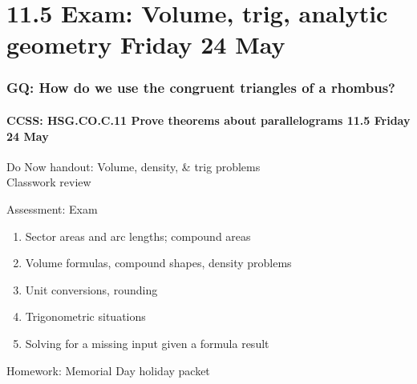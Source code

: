 \documentclass{beamer}
\begin{document}
\section{11.5 Exam: Volume, trig, analytic geometry Friday 24 May}
  \frame
  {
    \frametitle{GQ: How do we use the congruent triangles of a rhombus?}
    \framesubtitle{CCSS: HSG.CO.C.11 Prove theorems about parallelograms \hfill \alert{11.5 Friday 24 May}}

    Do Now handout: Volume, density, \& trig problems\\
    Classwork review
    \begin{block}{Assessment: Exam}
      \begin{enumerate}
        \item Sector areas and arc lengths; compound areas
        \item Volume formulas, compound shapes, density problems
        \item Unit conversions, rounding
        \item Trigonometric situations
        \item Solving for a missing input given a formula result
    \end{enumerate}
    \end{block}
    Homework: Memorial Day holiday packet
  }
\end{document}
